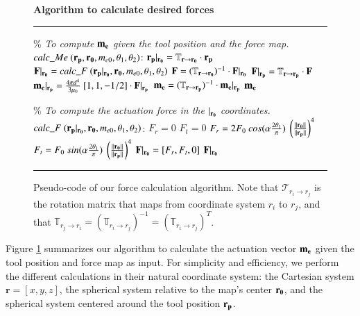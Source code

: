\begin{figure}[!t]
    \bigskip
    \textbf{Algorithm to calculate desired forces}\\
    \rule[5.0pt]{\columnwidth}{0.75pt}
    \vspace{-15pt}
    \begin{algorithmic}
    \STATE \% \emph{To compute} $\mathbf{m_{e}}$ \emph{given the tool position and the force map.}
    \REQUIRE $calc\_Me \ (\mathbf{r_{p}}, \mathbf{r_{0}}, m_{e0}, \theta_1, \theta_2)$:
    \STATE $\mathbf{r_{p}} \rvert_{\mathbf{r_{0}}} = \mathbb{T}_{\mathbf{r} \to \mathbf{r_{0}}} \cdot  \mathbf{r_{p}} $
    \STATE $\mathbf{F} \rvert_{\rsBold} = calc\_F \ (\RpenBold\rvert_{\rsBold}, \rsBold, m_{e0}, \theta_1, \theta_2)$
    \STATE $\mathbf{F} = (\mathbb{T}_{\mathbf{r} \to \mathbf{r_{0}}})^{-1} \cdot  \mathbf{F} \rvert_{\mathbf{r_{0}}} $
    \STATE $\mathbf{F} \rvert_{\mathbf{r_{p}}} = \mathbb{T}_{\mathbf{r} \to \mathbf{r_{p}}} \cdot \mathbf{F}$
    \STATE $\mathbf{m_{e}} \rvert_{\mathbf{r_{p}}} = \frac{4 \pi d^4}{3 \mu_0} \ [1,1,-1/2] \cdot \mathbf{F} \rvert_{\mathbf{r_{p}}}$
    \STATE $\mathbf{m_{e}} = (\mathbb{T}_{\mathbf{r} \to \mathbf{r_{p}}})^{-1} \cdot \mathbf{m_{e}} \rvert_{\mathbf{r_{p}}}$
    \RETURN $\mathbf{m_{e}}$
    \end{algorithmic}
    \vspace{5pt}
    \begin{algorithmic}
    \STATE \% \emph{To compute the actuation force  in the} $\rvert_{\mathbf{r_{0}}}$ \emph{coordinates.}
    \REQUIRE $calc\_F \ (\mathbf{r_{p}}\rvert_{\mathbf{r_{0}}}, \mathbf{r_{0}}, m_{e0}, \theta_1, \theta_2)$:
    \STATE $F_r = 0$
    \STATE $F_t = 0$
    \STATE $F_r = 2 F_0 \ cos(\alpha\frac{2\theta_1}{\pi}) \ \left(\frac{||\rsBold||}{||\RpenBold||}\right)^4$
    \STATE $F_t = F_0 \ sin(\alpha\frac{2\theta_1}{\pi}) \ \left(\frac{||\rsBold||}{||\RpenBold||}\right)^4$
    \ENDIF 
    \STATE $\mathbf{F} \rvert_{\mathbf{r_{0}}} = [F_r, F_t, 0]$
    \RETURN $\mathbf{F} \rvert_{\mathbf{r_{0}}}$
    \end{algorithmic}
    \rule[0.0pt]{\columnwidth}{0.75pt}
    \caption{Pseudo-code of our force calculation algorithm. Note that $\mathcal{T}_{r_i \to r_j}$ is the rotation matrix that maps from coordinate system $r_i$ to $r_j$, and that $\mathbb{T}_{r_j \to r_i} = (\mathbb{T}_{r_i \to r_j})^{-1} = (\mathbb{T}_{r_i \to r_j})^{T}$.}
    \label{fig:algorithm}
\end{figure}

Figure \ref{fig:algorithm} summarizes our algorithm to calculate the actuation vector $\mathbf{m_{e}}$ given the tool position and force map as input.
For simplicity and efficiency, we perform the different calculations in their natural coordinate system: the Cartesian system $\mathbf{r} = [x,y,z]$, the spherical system relative to the map's center $\mathbf{r_{0}}$, and the spherical system centered around the tool position $\mathbf{r_{p}}$.

